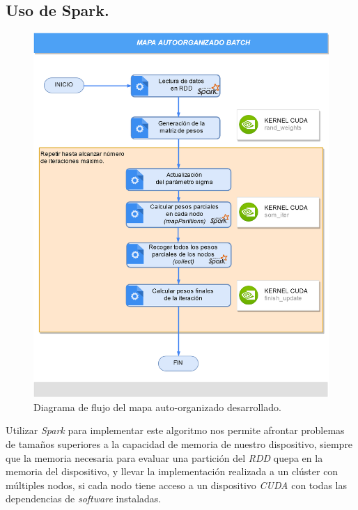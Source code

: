 \subsection{Uso de Spark.}
\begin{figure}[ht]
\centering
\includegraphics[scale=0.25]{imagenes/flujosparksom.png}
\caption{Diagrama de flujo del mapa auto-organizado desarrollado.}
\label{image:flujosparksom}
\end{figure}

Utilizar \textit{Spark} para implementar este algoritmo nos permite afrontar problemas de tamaños superiores a la capacidad de memoria de nuestro dispositivo, siempre que la memoria necesaria para evaluar una partición del \textit{RDD} quepa en la memoria del dispositivo, y llevar la implementación realizada a un clúster con múltiples nodos, si cada nodo tiene acceso a un dispositivo \textit{CUDA} con todas las dependencias de \textit{software} instaladas.\\


